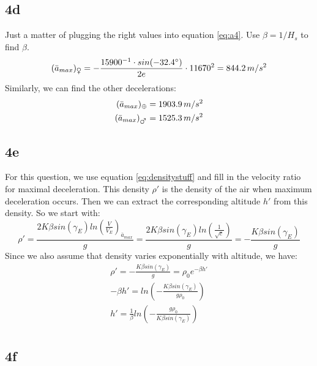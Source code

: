 \subsection{4d}
Just a matter of plugging the right values into equation \ref{eq:a4}. Use $\beta = 1/H_s$ to find $\beta$.
\begin{equation}
    (\bar{a}_{max})_{\venus} = - \frac{15900^{-1} \cdot sin(-32.4 ^\circ)}{2 e} \cdot 11670^2 = 844.2 \, m/s^2
\end{equation}
Similarly, we can find the other decelerations:
\begin{equation}
\begin{split}
    (\bar{a}_{max})_{\oplus} = 1903.9 \, m/s^2 \\
    (\bar{a}_{max})_{\mars} =  1525.3 \, m/s^2 \\
\end{split}
\end{equation}

\subsection{4e}
For this question, we use equation \ref{eq:densitystuff} and fill in the velocity ratio for maximal deceleration. This density $\rho'$ is the density of the air when maximum deceleration occurs. Then we can extract the corresponding altitude $h'$ from this density.
So we start with:
\begin{equation}
    \rho' = \frac{2 K \beta sin(\gamma_E) ln(\frac{V}{V_E})_{\bar{a}_{max}}}{g} = \frac{2 K \beta sin(\gamma_E) ln(\frac{1}{\sqrt{e}})}{g} = -\frac{K \beta sin(\gamma_E)}{g}
\end{equation}
Since we also assume that density varies exponentially with altitude, we have:
\begin{equation}
\begin{split}
    \rho' = -\frac{K \beta sin(\gamma_E)}{g} = \rho_0 e^{- \beta h'} \\
    -\beta h' = ln \left( -\frac{K \beta sin(\gamma_E)}{g \rho_0} \right) \\
    h' = \frac{1}{\beta} ln \left( -\frac{g \rho_0}{K \beta sin(\gamma_E)} \right) \\
\end{split}
\end{equation}

\subsection{4f}

